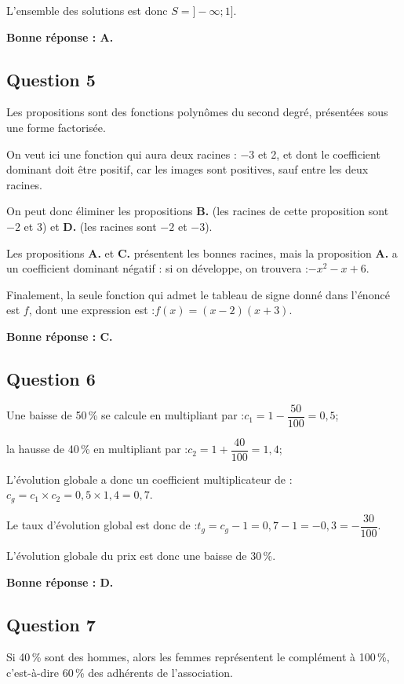 \documentclass[10pt]{article}
\begin{document}
	L'ensemble des solutions est donc $S = ]-\infty ; 1]$.

	\textbf{Bonne réponse : A.}

\subsection*{Question 5}
	Les propositions sont des fonctions polynômes du second degré, présentées sous une forme factorisée.

	On veut ici une fonction qui aura deux racines : $-3$ et 2, et dont le coefficient dominant doit être positif, car les images sont positives, sauf entre les deux racines.

	On peut donc éliminer les propositions \textbf{B.} (les racines de cette proposition sont $-2$ et $3$) et \textbf{D.} (les racines sont $-2$ et $-3$).

	Les propositions \textbf{A.} et \textbf{C.} présentent les bonnes racines, mais la proposition \textbf{A.} a un coefficient dominant négatif : si on développe, on trouvera :\quad $-x^2 -x + 6$.

	Finalement, la seule fonction qui admet le tableau de signe donné dans l'énoncé est $f$, dont une expression est :\quad $f(x) = (x - 2)(x + 3)$.

	\textbf{Bonne réponse : C.}

\subsection*{Question 6}
	Une baisse de 50\,\% se calcule en multipliant par :\quad $c_1 = 1 - \dfrac{50}{100} = 0,5$;

	la hausse de 40\,\% en multipliant par :\quad $c_2 = 1 + \dfrac{40}{100} = 1,4$;

	L'évolution globale a donc un coefficient multiplicateur de :\quad $c_g = c_1  \times c_2 = 0,5 \times 1,4 = 0,7$.

	Le taux d'évolution global est donc de :\quad $t_g = c_g - 1 = 0,7 - 1 = -0,3 = -\dfrac{30}{100}$.

	L'évolution globale du prix est donc une baisse de 30\,\%.

	\textbf{Bonne réponse : D.}

\subsection*{Question 7}
	Si 40\,\% sont des hommes, alors les femmes représentent le complément à 100\,\%, c'est-à-dire 60\,\% des adhérents de l'association.
\end{document}
